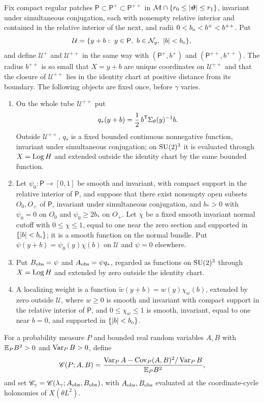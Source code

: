 \begin{definition}\label{ch31:def:regular-observables}
Fix compact regular patches $\mathsf P\subset\mathsf P^+\subset\mathsf P^{++}$ in $\mathcal M\cap\{r_0\le\lvert \bm\vartheta\rvert\le r_1\}$, invariant under simultaneous conjugation, each with nonempty relative interior and contained in the relative interior of the next, and radii $0<b_{\rm o}<b^+<b^{++}$. Put
\[
 \mathcal U=\{y+b:\ y\in\mathsf P,\ b\in\mathcal N_{y},\ \lvert b\rvert<b_{\rm o}\},
\]
and define $\mathcal U^+$ and $\mathcal U^{++}$ in the same way with $(\mathsf P^+,b^+)$ and $(\mathsf P^{++},b^{++})$. The radius $b^{++}$ is so small that $X=y+b$ are unique coordinates on $\mathcal U^{++}$ and that the closure of $\mathcal U^{++}$ lies in the identity chart at positive distance from its boundary. The following objects are fixed once, before $\gamma$ varies.
\begin{enumerate}
\item On the whole tube $\mathcal U^{++}$ put
\[
 q_*(y+b)=\frac12\,b^{\mathsf T}\Sigma_\theta(y)^{-1}b .
\]
Outside $\mathcal U^{++}$, $q_*$ is a fixed bounded continuous nonnegative function, invariant under simultaneous conjugation; on $\mathrm{SU}(2)^3$ it is evaluated through $X=\operatorname{Log} H$ and extended outside the identity chart by the same bounded function.
\item Let $\psi_0:\mathsf P\to[0,1]$ be smooth and invariant, with compact support in the relative interior of $\mathsf P$, and suppose that there exist nonempty open subsets $O_0,O_+$ of $\mathsf P$, invariant under simultaneous conjugation, and $b_*>0$ with $\psi_0=0$ on $O_0$ and $\psi_0\ge2b_*$ on $O_+$. Let $\chi$ be a fixed smooth invariant normal cutoff with $0\le\chi\le1$, equal to one near the zero section and supported in $\{\lvert b\rvert<b_{\rm o}\}$; it is a smooth function on the normal bundle. Put $\psi(y+b)=\psi_0(y)\chi(b)$ on $\mathcal U$ and $\psi=0$ elsewhere.
\item Put $B_{\mathrm{obs}}=\psi$ and $A_{\mathrm{obs}}=\psi q_*$, regarded as functions on $\mathrm{SU}(2)^3$ through $X=\operatorname{Log} H$ and extended by zero outside the identity chart.
\item A localizing weight is a function $\widetilde w(y+b)=w(y)\chi_w(b)$, extended by zero outside $\mathcal U$, where $w\ge0$ is smooth and invariant with compact support in the relative interior of $\mathsf P$, and $0\le\chi_w\le1$ is smooth, invariant, equal to one near $b=0$, and supported in $\{\lvert b\rvert<b_{\rm o}\}$.
\end{enumerate}
For a probability measure $P$ and bounded real random variables $A,B$ with $\mathbb E_PB^2>0$ and $\operatorname{Var}_PB>0$, define
\begin{equation}\label{ch31:eq:statistic}
 \mathscr C(P;A,B)=\frac{\operatorname{Var}_PA-\operatorname{Cov}_P(A,B)^2/\operatorname{Var}_PB}{\mathbb E_PB^2},
\end{equation}
and set $\mathscr C_\gamma=\mathscr C(\lambda_\gamma;A_{\mathrm{obs}},B_{\mathrm{obs}})$, with $A_{\mathrm{obs}},B_{\mathrm{obs}}$ evaluated at the coordinate-cycle holonomies of $X(\theta L^2)$.
\end{definition}


